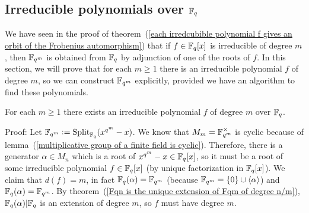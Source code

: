 \subsection{\texorpdfstring{Irreducible polynomials over $\mathbb{F}_{q}$}{Irreducible polynomials over }}
We have seen in the proof of theorem~(\ref{each irredcubible polynomial f gives an orbit of the Frobenius automorphism}) that if $f\in\mathbb{F}_q[x]$ is irreducible of degree $m$, then $\mathbb{F}_{q^m}$ is obtained from $\mathbb{F}_q$ by adjunction of one of the roots of $f$. In this section, we will prove that for each $m\geq1$ there is an irreducible polynomial $f$ of degree $m$, so we can construct $\mathbb{F}_{q^m}$ explicitly, provided we have an algorithm to find these polynomials. 
\begin{dang}
    \begin{theorem}
        For each $m\geq1$ there exists an irreducible polynomial $f$ of degree $m$ over $\mathbb{F}_q$.
    \end{theorem}
\end{dang}
Proof: Let $\bb{F}_{q^m}\bydef\text{Split}_{\fq}(x^{q^m}-x)$. We know that $M_m=\mathbb{F}_{q^m}^\times$ is cyclic because of lemma~(\ref{multiplicative group of a finite field is cyclic}). Therefore, there is a generator $\alpha\in M_n$ which is a root of $x^{q^m}-x\in\mathbb{F}_q[x]$, so it must be a root of some irreducible polynomial $f\in\mathbb{F}_q[x]$ (by unique factorization in $\mathbb{F}_q[x]$). We claim that $d(f)=m$, in fact $\mathbb{F}_q(\alpha)=\mathbb{F}_{q^m}$ (because $\mathbb{F}_{q^m}=\{0\}\cup \langle\alpha\rangle$) and $\mathbb{F}_q(\alpha)=\mathbb{F}_{q^m}$. By theorem~(\ref{Fqn is the unique extension of Fqm of degree n/m}), $\mathbb{F}_q(\alpha)|\mathbb{F}_q$ is an extension of degree $m$, so $f$ must have degree $m$.\par

